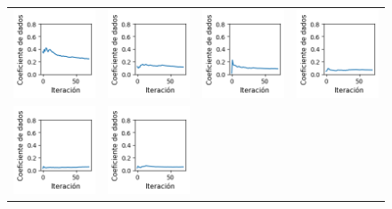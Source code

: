 \begin{figure}[!b]
    \centering
    \begin{tabular}{cccc}
        \includegraphics[width=3.5cm]{../Plots/dl_epoch_0.png} &
        \includegraphics[width=3.5cm]{../Plots/dl_epoch_1.png} &
        \includegraphics[width=3.5cm]{../Plots/dl_epoch_2.png} &

        \includegraphics[width=3.5cm]{../Plots/dl_epoch_3.png} \\
        \includegraphics[width=3.5cm]{../Plots/dl_epoch_4.png} &
        \includegraphics[width=3.5cm]{../Plots/dl_epoch_5.png} &


\end{tabular}
\end{figure}

